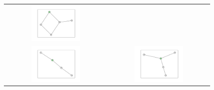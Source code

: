 \documentclass[12pt, a4paper]{extarticle}
\begin{document}
\begin{figure}
\begin{tabularx}{\textwidth}{cc}
\includegraphics[width=0.5\textwidth]{task11-graphlets/5_16-18-25-22-23.pdf} \\
\includegraphics[width=0.5\textwidth]{task11-graphlets/4_16-21-18-23.pdf} &
\includegraphics[width=0.5\textwidth]{task11-graphlets/5_14-21-18-23-24.pdf} \\
\end{tabularx}\end{figure}
\end{document}
